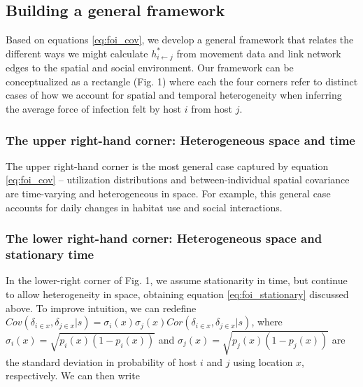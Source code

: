 \documentclass[letterpaper]{article}
\begin{document}
\subsection*{Building a general framework}

Based on equations \ref{eq:foi_cov}, we develop a general framework that relates the different ways we might calculate $h^*_{i \leftarrow j}$ from movement data and link network edges to the spatial and social environment. Our framework can be conceptualized as a rectangle (Fig. 1) where each the four corners refer to distinct cases of how we account for spatial and temporal heterogeneity when inferring the average force of infection felt by host $i$ from host $j$.  

\subsubsection*{The upper right-hand corner: Heterogeneous space and time}

The upper right-hand corner is the most general case captured by equation \ref{eq:foi_cov} -- utilization distributions and between-individual spatial covariance are time-varying and heterogeneous in space.  For example, this general case accounts for daily changes in habitat use and social interactions. 

\subsubsection*{The lower right-hand corner: Heterogeneous space and stationary time}

In the lower-right corner of Fig. 1, we assume stationarity in time, but continue to allow heterogeneity in space, obtaining equation \ref{eq:foi_stationary} discussed above.  To improve intuition, we can redefine $Cov(\delta_{i \in x}, \delta_{j \in x} | s) = \sigma_i(x) \sigma_j(x) Cor(\delta_{i \in x}, \delta_{j \in x} | s)$, where $\sigma_i(x) = \sqrt{p_i(x)(1 - p_i(x))}$  and $\sigma_j(x) = \sqrt{p_j(x)(1 - p_j(x))}$ are the standard deviation in probability of host $i$ and $j$ using location $x$, respectively.  We can then write
\end{document}

